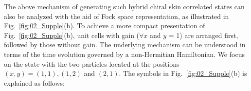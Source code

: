 \documentclass[longbibliography, aps, prx, amsmath, amssymb, amsfonts, twocolumn,superscriptaddress, footinbib]{revtex4-1}
\begin{document}
	The above mechanism of generating such hybrid chiral skin correlated states can also be analyzed with the aid of Fock space representation, as illustrated in Fig.~\ref{fig:02_Supple}(b). 
	To achieve a more compact presentation of Fig.~\ref{fig:02_Supple}(b), unit cells with gain ($\forall x$ and $y$ = 1) are arranged first, followed by those without gain.
	The underlying mechanism can be understood in terms of the time evolution governed by a non-Hermitian Hamiltonian. 
	We focus on the state with the two particles located at the positions $(x,y)=(1,1), (1,2)$ and $(2,1)$.
	The symbols in Fig.~\ref{fig:02_Supple}(b) is explained as follows:
\end{document}
